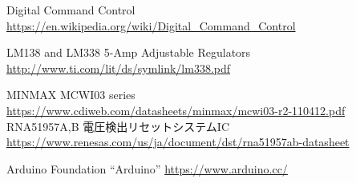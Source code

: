 \begin{thebibliography}{2}
Digital Command Control
\url{https://en.wikipedia.org/wiki/Digital_Command_Control}

  LM138 and LM338 5-Amp Adjustable Regulators
  \url{http://www.ti.com/lit/ds/symlink/lm338.pdf}

  MINMAX MCWI03 series
  \url{https://www.cdiweb.com/datasheets/minmax/mcwi03-r2-110412.pdf}
  RNA51957A,B 電圧検出リセットシステムIC
  \url{https://www.renesas.com/us/ja/document/dst/rna51957ab-datasheet}

  Arduino Foundation ``Arduino''
  \url{https://www.arduino.cc/}


\end{thebibliography}

